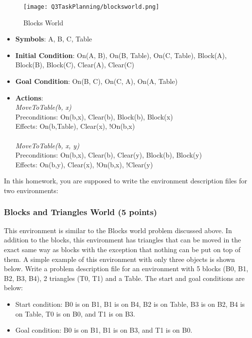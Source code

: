 \documentclass{article}
\newcommand{\?}{\stackrel{?}{=}}
\begin{document}
\begin{figure}[!h]
	\centering
	\texttt{[image: Q3TaskPlanning/blocksworld.png]}
	\caption{Blocks World}
	\label{fig:blocksworld}
\end{figure}

\begin{itemize}
	\item \textbf{Symbols}: A, B, C, Table
	\item \textbf{Initial Condition}: On(A, B), On(B, Table), On(C, Table), Block(A), Block(B), Block(C), Clear(A), Clear(C)
	\item \textbf{Goal Condition}: On(B, C), On(C, A), On(A, Table)
	\item \textbf{Actions}: \\
		\emph{MoveToTable(b, x)} \\
		Preconditions: On(b,x), Clear(b), Block(b), Block(x) \\
		Effects: On(b,Table), Clear(x), !On(b,x) \\
		\\
		\emph{MoveToTable(b, x, y)} \\
		Preconditions: On(b,x), Clear(b), Clear(y), Block(b), Block(y) \\
		Effects: On(b,y), Clear(x), !On(b,x), !Clear(y) \\
\end{itemize}

In this homework, you are supposed to write the environment description files for two environments:
%
\subsubsection{Blocks and Triangles World (5 points)} This environment is similar to the Blocks world problem discussed above. 
In addition to the blocks, this environment has triangles that can be moved in the exact same way as blocks with the exception that nothing can be put on top of them.
A simple example of this environment with only three objects is shown below. Write a problem description file for an environment with 5 blocks (B0, B1, B2, B3, B4), 2 triangles
(T0, T1) and a Table. The start and goal conditions are below:
\begin{itemize}
	\item Start condition: B0 is on B1, B1 is on B4, B2 is on Table, B3 is on B2, B4 is on Table, T0 is on B0, and T1 is on B3.
	\item Goal condition: B0 is on B1, B1 is on B3, and T1 is on B0.
\end{itemize}
%
\end{document}
